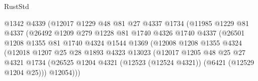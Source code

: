 \begin{lexlean}{RustStd}
\begin{coremodule}
                                  @1342
                                  @4339
                                  (@12017
                                    @1229
                                    @48
                                    @81
                                    @27
                                    @4337
                                    @1734
                                    (@11985
                                      @1229
                                      @81
                                      @4337
                                      (@26492
                                        @1209
                                        @279
                                        @1228
                                        @81
                                        @1740
                                        @4326
                                        @1740
                                        @4337
                                        (@26501
                                          @1208
                                          @1355
                                          @81
                                          @1740
                                          @4324
                                          @1544
                                          @1369
                                          (@12008
                                            @1208
                                            @1355
                                            @4324
                                            (@12018
                                              @1207
                                              @25
                                              @28
                                              @1893
                                              @4323
                                              @13023
                                              (@12017
                                                @1205
                                                @48
                                                @25
                                                @27
                                                @4321
                                                @1734
                                                (@26525
                                                  @1204
                                                  @4321
                                                  (@12523 (@12524 @4321))
                                                  (@6421 (@12529 @1204 @25)))
                                                @12054)))

\end{coremodule}
\end{lexlean}
